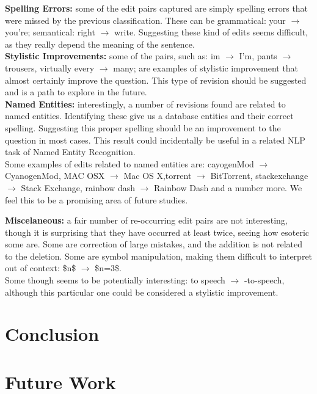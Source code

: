 \documentclass[11pt, oneside]{article}   	%
\begin{document}
{\bfseries Spelling Errors:} some of the edit pairs captured are simply spelling errors that were missed by the previous classification. These can be grammatical: your $\rightarrow$ you're; semantical: right $\rightarrow$ write. Suggesting these kind of edits seems difficult, as they really depend the meaning of the sentence.\\

{\bfseries Stylistic Improvements:} some of the pairs, such as: im $\rightarrow$ I'm, pants $\rightarrow$ trousers, virtually every $\rightarrow$ many; are examples of stylistic improvement that almost certainly improve the question. This type of revision should be suggested and is a path to explore in the future.\\

{\bfseries Named Entities:} interestingly, a number of revisions found are related to named entities. Identifying these give us a database entities and their correct spelling. Suggesting this proper spelling should be an improvement to the question in most cases. This result could incidentally be useful in a related NLP task of Named Entity Recognition.\\
Some examples of edits related to named entities are: cayogenMod $\rightarrow$ CyanogenMod, MAC OSX $\rightarrow$ Mac OS X,torrent $\rightarrow$ BitTorrent, stackexchange $\rightarrow$ Stack Exchange, rainbow dash $\rightarrow$ Rainbow Dash and a number more. We feel this to be a promising area of future studies.

{\bfseries Miscelaneous:} a fair number of re-occurring edit pairs are not interesting, though it is surprising that they have occurred at least twice, seeing how esoteric some are. Some are correction of large mistakes, and the addition is not related to the deletion. Some are symbol manipulation, making them difficult to interpret out of context: \$n\$ $\rightarrow$ \$n=3\$.\\
Some though seems to be potentially interesting: to speech $\rightarrow$ -to-speech, although this particular one could be considered a stylistic improvement.


\section{Conclusion}
\section{Future Work}
\end{document}
